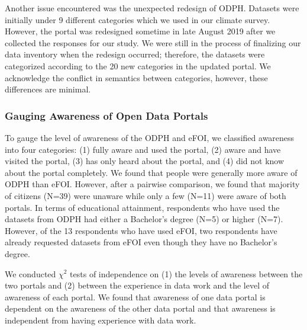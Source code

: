 \documentclass{sigchi}
\begin{document}
Another issue encountered was the unexpected redesign of ODPH. Datasets were initially under 9 different categories which we used in our climate survey. However, the portal was redesigned sometime in late August 2019 after we collected the responses for our study. We were still in the process of finalizing our data inventory when the redesign occurred; therefore, the datasets were categorized according to the 20 new categories in the updated portal. We acknowledge the conflict in semantics between categories, however, these differences are minimal.

\subsubsection{Gauging Awareness of Open Data Portals}
To gauge the level of awareness of the ODPH and eFOI, we classified awareness into four categories: (1) fully aware and used the portal, (2) aware and have visited the portal, (3) has only heard about the portal, and (4) did not know about the portal completely. We found that people were generally more aware of ODPH than eFOI. However, after a pairwise comparison, we found that majority of citizens (N=39) were unaware while only a few (N=11) were aware of both portals. In terms of educational attainment, respondents who have used the datasets from ODPH had either a Bachelor's degree (N=5) or higher (N=7). However, of the 13 respondents who have used eFOI, two respondents have already requested datasets from eFOI even though they have no Bachelor's degree. 

We conducted $\chi^2$ tests of independence on (1) the levels of awareness between the two portals and (2) between the experience in data work and the level of awareness of each portal. We found that awareness of one data portal is dependent on the awareness of the other data portal and that awareness is independent from having experience with data work.

\end{document}
